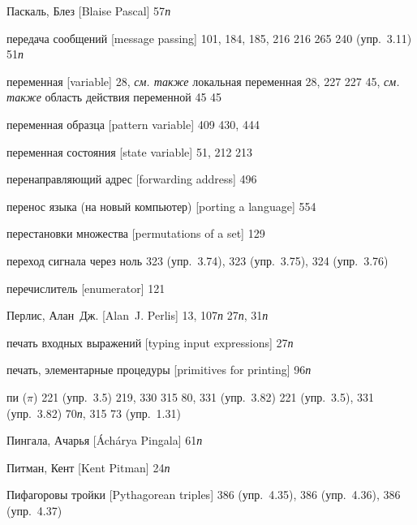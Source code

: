 \begin{theindex}
\item {Паскаль, Блез [Blaise Pascal]} 57{\it п}
\item {передача сообщений [message passing]} 101, 184, 185, 216
   216
   265
   240 (упр.~3.11)
   51{\it п}
\item {переменная [variable]} 28, {\it см. также} локальная переменная
   28, 227
   227
   45, {\it см. также} область действия переменной
   45
   45
\item {переменная образца [pattern variable]} 409
   430, 444
\item {переменная состояния [state variable]} 51, 212
   213
\item {перенаправляющий адрес [forwarding address]} 496
\item {перенос языка (на новый компьютер) [porting a language]} 554
\item {перестановки множества [permutations of a set]} 129
\item {переход сигнала через ноль} 323 (упр.~3.74), 323 (упр.~3.75), 324 (упр.~3.76)
\item {перечислитель [enumerator]} 121
\item {Перлис, Алан~Дж. [Alan~J. Perlis]} 13, 107{\it п}
   27{\it п}, 31{\it п}
\item {печать входных выражений [typing input expressions]} 27{\it п}
\item {печать, элементарные процедуры [primitives for printing]} 96{\it п}
\item {пи ($\pi$)}
   221 (упр.~3.5)
   219, 330
   315
   80, 331 (упр.~3.82)
   221 (упр.~3.5), 331 (упр.~3.82)
   70{\it п}, 315
   73 (упр.~1.31)
\item {Пингала, Ачарья [\'Ach\'arya Pingala]} 61{\it п}
\item {Питман, Кент [Kent Pitman]} 24{\it п}
\item {Пифагоровы тройки [Pythagorean triples]}
   386 (упр.~4.35), 386 (упр.~4.36), 386 (упр.~4.37)

\end{theindex}

